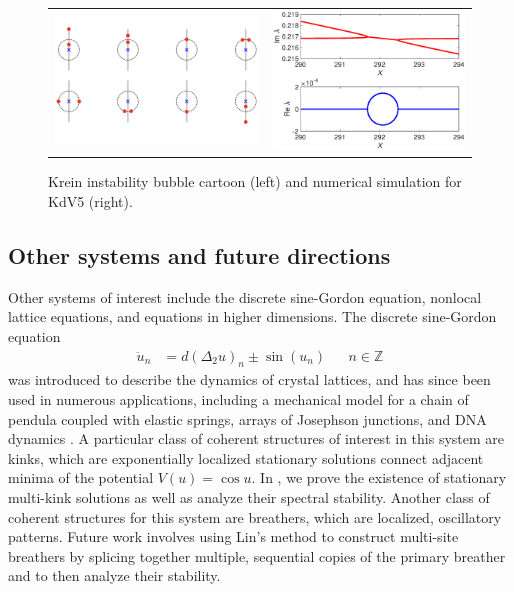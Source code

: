 \documentclass[12pt,reqno,oneside]{article}
\begin{document}
\begin{figure}[H]
\begin{center}
\begin{tabular}{cc}
\includegraphics[width=8cm]{images/KreinBubbleCartoonSS2.png} & 
\includegraphics[width=7.5cm]{images/kreinbubble1.eps}
\end{tabular}
\end{center}
\caption{Krein instability bubble cartoon (left) and numerical simulation for KdV5 (right).}
\label{fig:kreinbubble1}
\end{figure}

\subsection*{Other systems and future directions}

Other systems of interest include the discrete sine-Gordon equation, nonlocal lattice equations, and equations in higher dimensions. The discrete sine-Gordon equation
\begin{align*}
	\ddot{u}_n &= d (\Delta_2 u)_n \pm \sin(u_n) && n \in \mathbb{Z}
\end{align*}
was introduced to describe the dynamics of crystal lattices, and has since been used in numerous applications, including a mechanical model for a chain of pendula coupled with elastic springs, arrays of Josephson junctions, and DNA dynamics \cite{braun2004}. A particular class of coherent structures of interest in this system are kinks, which are exponentially localized stationary solutions connect adjacent minima of the potential $V(u) = \cos u$. In \cite{parkerSG}, we prove the existence of stationary multi-kink solutions as well as analyze their spectral stability. Another class of coherent structures for this system are breathers, which are localized, oscillatory patterns. Future work involves using Lin's method to construct multi-site breathers by splicing together multiple, sequential copies of the primary breather and to then analyze their stability.
\end{document}
